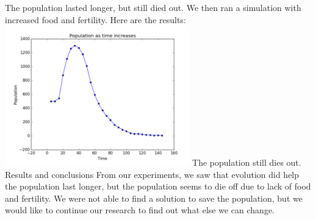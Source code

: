 \documentclass[11pt]{article}
\begin{document}
\begin{multicols}{2}
The population lasted longer, but still died out. We then ran a simulation with increased food and fertility. Here are the results: \newline
\includegraphics[width=80mm]{both.PNG} \newline
The population still dies out. \newline
\center 
Results and conclusions
\flushleft
From our experiments, we saw that evolution did help the population last longer, but the population seems to die off due to lack of food and fertility. We were not able to find a solution to save the population, but we would like to continue our research to find out what else we can change.









\end{multicols}
\end{document}
